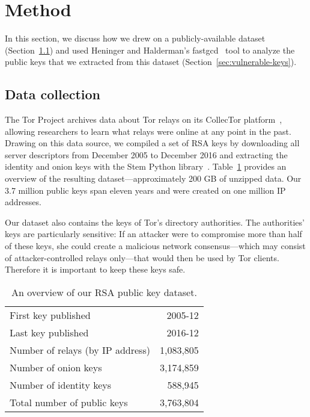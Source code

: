 \section{Method}
\label{sec:method}
In this section, we discuss how we drew on a publicly-available dataset
(Section~\ref{sec:data-collection}) and used Heninger and Halderman's 
fastgcd~\cite{fastgcd} tool to analyze the public keys that 
we extracted from this dataset (Section~\ref{sec:vulnerable-keys}).

\subsection{Data collection}
\label{sec:data-collection}
The Tor Project archives data about Tor relays on its CollecTor
platform~\cite{collector}, allowing researchers to learn what relays were online
at any point in the past.  Drawing on this data source, we compiled a set of RSA
keys by downloading all server descriptors from December 2005 to December 2016 
and extracting the identity and onion keys with the Stem Python
library~\cite{stem}.  Table~\ref{tab:dataset} provides an overview of the
resulting dataset---approximately 200 GB of unzipped data.  Our 3.7 million
public keys span eleven years and were created on one million IP addresses.

Our dataset also contains the keys of Tor's directory authorities.  The
authorities' keys are particularly sensitive: If an attacker were to compromise
more than half of these keys, she could create a malicious network
consensus---which may consist of attacker-controlled relays only---that would
then be used by Tor clients.  Therefore it is important to keep these keys safe.

\begin{table}[t]
	\centering
	\begin{tabular}{l r}
	\toprule

	First key published & 2005-12 \\
	Last key published & 2016-12 \\

	\midrule

	Number of relays (by IP address) & 1,083,805 \\
	Number of onion keys & 3,174,859 \\
	Number of identity keys & 588,945 \\
	Total number of public keys & 3,763,804 \\

	\bottomrule
	\end{tabular}
	\caption{An overview of our RSA public key dataset.}
	\label{tab:dataset}
\end{table}

